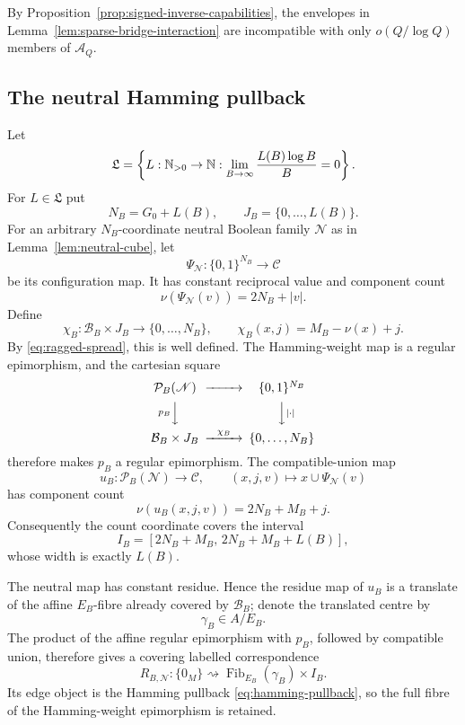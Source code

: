 By Proposition~\ref{prop:signed-inverse-capabilities}, the envelopes in Lemma~\ref{lem:sparse-bridge-interaction} are incompatible with only $o(Q/\log Q)$ members of $\mathcal A_Q$.

\subsection{The neutral Hamming pullback}

Let
\begin{equation}\label{eq:startup-function-class}
\mathfrak L=
\left\{
L:\mathbb N_{>0}\to\mathbb N:
\lim_{B\to\infty}\frac{L(B)\log B}{B}=0
\right\}.
\end{equation}
For $L\in\mathfrak L$ put
\[
N_B=G_0+L(B),
\qquad
J_B=\{0,\ldots,L(B)\}.
\]
For an arbitrary $N_B$-coordinate neutral Boolean family $\mathscr N$ as in Lemma~\ref{lem:neutral-cube}, let
\[
\Psi_{\mathscr N}:\{0,1\}^{N_B}\longrightarrow\mathcal C
\]
be its configuration map.  It has constant reciprocal value and component count
\[
\nu(\Psi_{\mathscr N}(v))=2N_B+|v|.
\]
Define
\[
\chi_B:\mathcal B_B\times J_B\longrightarrow\{0,\ldots,N_B\},
\qquad
\chi_B(x,j)=M_B-\nu(x)+j.
\]
By \eqref{eq:ragged-spread}, this is well defined.  The Hamming-weight map is a regular epimorphism, and the cartesian square
\begin{equation}\label{eq:hamming-pullback}
\begin{CD}
\mathcal P_B(\mathscr N) @>>> \{0,1\}^{N_B}\\
@V{p_B}VV @VV{|\cdot|}V\\
\mathcal B_B\times J_B @>{\chi_B}>> \{0,\ldots,N_B\}
\end{CD}
\end{equation}
therefore makes $p_B$ a regular epimorphism.  The compatible-union map
\[
u_B:\mathcal P_B(\mathscr N)\longrightarrow\mathcal C,
\qquad
(x,j,v)\longmapsto x\cup\Psi_{\mathscr N}(v)
\]
has component count
\[
\nu(u_B(x,j,v))
=2N_B+M_B+j.
\]
Consequently the count coordinate covers the interval
\begin{equation}\label{eq:common-count-interval}
I_B=[2N_B+M_B,\,2N_B+M_B+L(B)],
\end{equation}
whose width is exactly $L(B)$.

The neutral map has constant residue.  Hence the residue map of $u_B$ is a translate of the affine $E_B$-fibre already covered by $\mathcal B_B$; denote the translated centre by
\begin{equation}\label{eq:full-centre}
\gamma_B\in A/E_B.
\end{equation}
The product of the affine regular epimorphism with $p_B$, followed by compatible union, therefore gives a covering labelled correspondence
\begin{equation}\label{eq:wide-start-correspondence}
R_{B,\mathscr N}:\{0_M\}\rightsquigarrow
\operatorname{Fib}_{E_B}(\gamma_B)\times I_B.
\end{equation}
Its edge object is the Hamming pullback \eqref{eq:hamming-pullback}, so the full fibre of the Hamming-weight epimorphism is retained.

